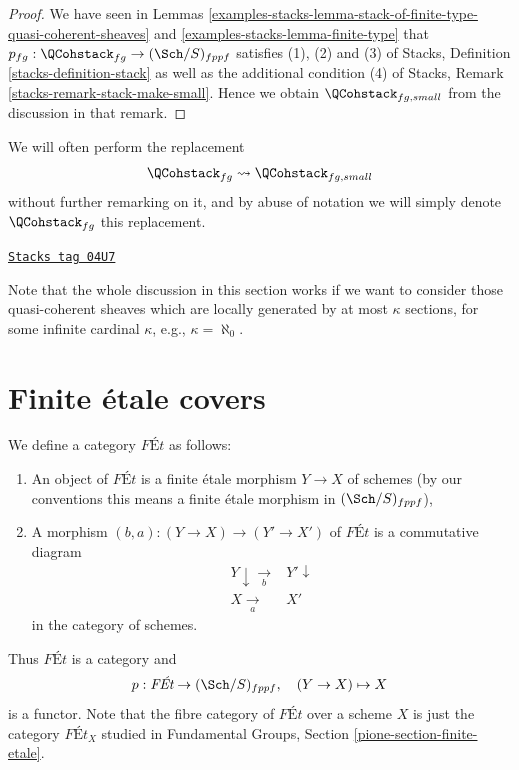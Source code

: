 \begin{proof}
We have seen in
Lemmas \ref{examples-stacks-lemma-stack-of-finite-type-quasi-coherent-sheaves} and
\ref{examples-stacks-lemma-finite-type}
that $p_{fg} : \QCohstack_{fg} \to (\Sch/S)_{fppf}$
satisfies (1), (2) and (3) of
Stacks, Definition \ref{stacks-definition-stack}
as well as the additional condition (4) of
Stacks, Remark \ref{stacks-remark-stack-make-small}.
Hence we obtain $\QCohstack_{fg, small}$ from the discussion
in that remark.
\end{proof}

We will often perform the replacement
$$
\QCohstack_{fg} \leadsto \QCohstack_{fg, small}
$$
without further remarking on it, and by abuse of notation we will
simply denote $\QCohstack_{fg}$ this replacement.

\begin{remark}
\label{examples-stacks-remark-higher-rank}
\href{https://stacks.math.columbia.edu/tag/04U7}{\texttt{Stacks tag 04U7}}

Note that the whole discussion in this section works
if we want to consider those
quasi-coherent sheaves which are locally generated by at most $\kappa$
sections, for some infinite cardinal $\kappa$, e.g., $\kappa = \aleph_0$.
\end{remark}

\section{Finite \'etale covers}
\label{examples-stacks-section-finite-etale}
We define a category $\textit{F\'Et}$ as follows:
\begin{enumerate}
\item An object of $\textit{F\'Et}$ is a finite \'etale morphism $Y \to X$
of schemes (by our conventions this means a finite \'etale morphism
in $(\Sch/S)_{fppf}$),
\item A morphism $(b, a) : (Y \to X) \to (Y' \to X')$ of $\textit{F\'Et}$
is a commutative diagram
$$
\begin{array}{cc}Y \downarrow\underset{b}{\longrightarrow} & Y' \downarrow \\ X \underset{a}{\longrightarrow} & X'\end{array}
$$
in the category of schemes.
\end{enumerate}
Thus $\textit{F\'Et}$ is a category and
$$
p : \textit{F\'Et} \to (\Sch/S)_{fppf},
\quad
(Y \to X) \mapsto X
$$
is a functor. Note that the fibre category of $\textit{F\'Et}$ over
a scheme $X$ is just the category $\textit{F\'Et}_X$ studied in
Fundamental Groups, Section \ref{pione-section-finite-etale}.

